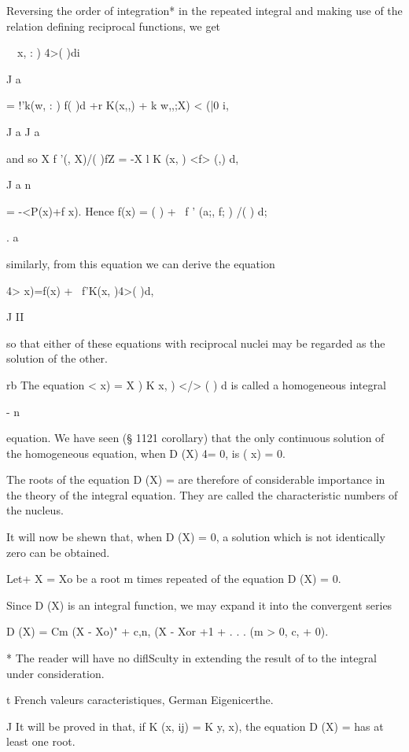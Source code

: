 Reversing the order of integration* in the repeated integral and
making use of the relation defining reciprocal functions, we get

\ \ x, : ) 4>( )di

J a

= !'k(w, : ) f( )d +r K(x,,) + k w,,;X) < (|0 i,

J a J a

and so X f '(, X)/( )fZ = -X l K (x, ) <f> (,) d,

J a n

= -<P(x)+f x). Hence f(x) = ( ) + \ f ' (a;, f; ) /( ) d;

. a

similarly, from this equation we can derive the equation

4> x)=f(x) + \ f'K(x, )4>( )d,

J II

so that either of these equations with reciprocal nuclei may be
regarded as the solution of the other.


rb The equation < x) = X ) K x, ) </> ( ) d is called a homogeneous
integral

- n

equation. We have seen (§ 1121 corollary) that the only continuous
solution of the homogeneous equation, when D (X) 4= 0, is ( x) = 0.

The roots of the equation D (X) = are therefore of considerable
importance in the theory of the integral equation. They are called the
characteristic numbers of the nucleus.

It will now be shewn that, when D (X) = 0, a solution which is not
identically zero can be obtained.

Let+ X = Xo be a root m times repeated of the equation D (X) = 0.

Since D (X) is an integral function, we may expand it into the
convergent series

D (X) = Cm (X - Xo)" + c,n, (X - Xor +1 + . . . (m > 0, c, + 0).

* The reader will have no diflSculty in extending the result of
to the integral under consideration.

t French valeurs caracteristiques, German Eigenicerthe.

J It will be proved in that, if K (x, ij) = K y, x), the
equation D (X) = has at least one root.

